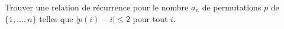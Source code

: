 Trouver une relation de récurrence pour le nombre $a_n$ de permutations $p$ de $\{1, \ldots, n\}$ telles que $|p(i) - i| \leq 2$ pour tout $i$.
